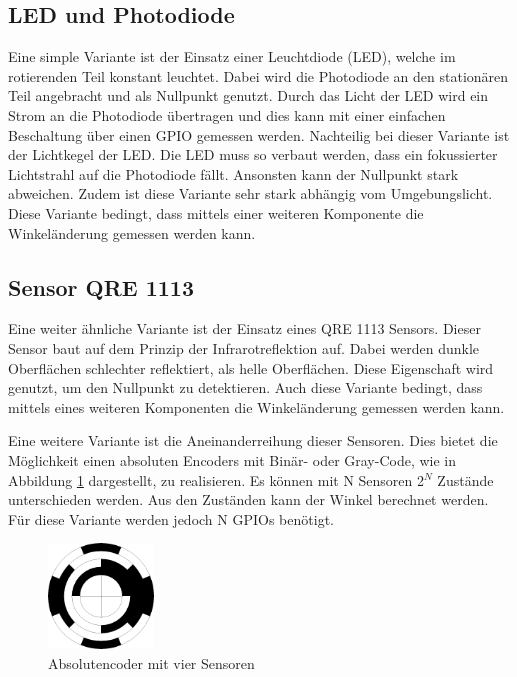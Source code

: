 \subsection{LED und Photodiode}
\label{sec:LED}
Eine simple Variante ist der Einsatz einer Leuchtdiode (LED), welche im rotierenden Teil konstant leuchtet. Dabei wird die Photodiode an den stationären Teil angebracht und als Nullpunkt genutzt. Durch das Licht der LED wird ein Strom an die Photodiode übertragen und dies kann mit einer einfachen Beschaltung über einen GPIO gemessen werden. Nachteilig bei dieser Variante ist der Lichtkegel der LED. Die LED muss so verbaut werden, dass ein fokussierter Lichtstrahl auf die Photodiode fällt. Ansonsten kann der  Nullpunkt stark abweichen. Zudem ist diese Variante sehr stark abhängig vom Umgebungslicht. Diese Variante bedingt, dass mittels einer weiteren Komponente die Winkeländerung gemessen werden kann.

\subsection{Sensor QRE 1113}
\label{sec:QRE}
Eine weiter ähnliche Variante ist der Einsatz eines QRE 1113 Sensors. Dieser Sensor baut auf dem Prinzip der Infrarotreflektion auf. Dabei werden dunkle Oberflächen schlechter reflektiert, als helle Oberflächen. Diese Eigenschaft wird genutzt, um den Nullpunkt zu detektieren. Auch diese Variante bedingt, dass mittels eines weiteren Komponenten die Winkeländerung gemessen werden kann.

Eine weitere Variante ist die Aneinanderreihung dieser Sensoren. Dies bietet die Möglichkeit einen absoluten Encoders mit Binär- oder Gray-Code, wie in Abbildung \ref{fig:Encoder} dargestellt, zu realisieren. Es können mit N Sensoren 2$^N$ Zustände unterschieden werden. Aus den Zuständen kann der Winkel berechnet werden. Für diese Variante werden jedoch N GPIOs benötigt.
\begin{figure}[H]
	\centering
	\includegraphics[width=0.25\textwidth]{resources/encoder.png}
	\caption[Absolutencoder mit vier Sensoren]{Absolutencoder mit vier Sensoren}
	\label{fig:Encoder}
\end{figure} 

